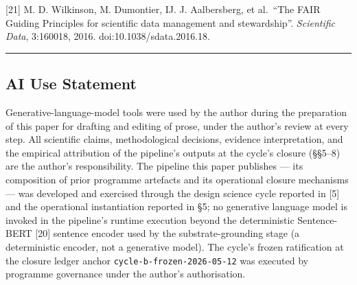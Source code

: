 \documentclass[
]{article}
\begin{document}
{[}21{]} M. D. Wilkinson, M. Dumontier, IJ. J. Aalbersberg, et al.~``The
FAIR Guiding Principles for scientific data management and
stewardship''. \emph{Scientific Data}, 3:160018, 2016.
doi:10.1038/sdata.2016.18.

\begin{center}\rule{0.5\linewidth}{0.5pt}\end{center}

\subsection{AI Use Statement}\label{ai-use-statement}

Generative-language-model tools were used by the author during the
preparation of this paper for drafting and editing of prose, under the
author's review at every step. All scientific claims, methodological
decisions, evidence interpretation, and the empirical attribution of the
pipeline's outputs at the cycle's closure (§§5--8) are the author's
responsibility. The pipeline this paper publishes --- its composition of
prior programme artefacts and its operational closure mechanisms --- was
developed and exercised through the design science cycle reported in
{[}5{]} and the operational instantiation reported in §5; no generative
language model is invoked in the pipeline's runtime execution beyond the
deterministic Sentence-BERT {[}20{]} sentence encoder used by the
substrate-grounding stage (a deterministic encoder, not a generative
model). The cycle's frozen ratification at the closure ledger anchor
\texttt{cycle-b-frozen-2026-05-12} was executed by programme governance
under the author's authorisation.
\end{document}
